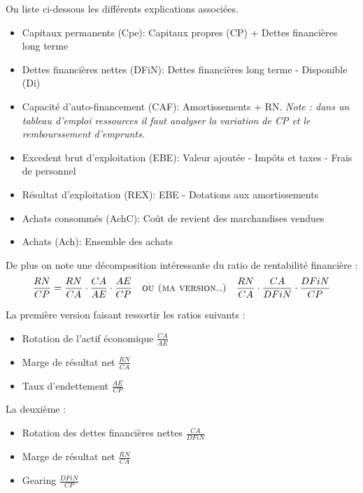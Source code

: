 \documentclass[12pt,oneside,a4paper]{article}
\begin{document}
On liste ci-dessous les différents explications associées.

\begin{itemize}[label=]

	\item Capitaux permanents (Cpe): Capitaux propres (CP) + Dettes financières long terme 
	\item Dettes financières nettes (DFiN): Dettes financières long terme - Disponible (Di)

	\item Capacité d'auto-financement (CAF): Amortissements + RN. \emph{Note : dans un tableau d'emploi ressources il faut analyser la variation de CP et le rembourssement d'emprunts.}

	\item Excedent brut d'exploitation (EBE): Valeur ajoutée - Impôts et taxes - Frais de personnel

	\item Résultat d'exploitation (REX): EBE - Dotations aux amortissements

	\item Achats consommés (AchC): Coût de revient des marchandises vendues

	\item Achats (Ach): Ensemble des achats

\end{itemize}

De plus on note une décomposition intéressante du ratio de rentabilité financière : 
\[
	\frac{RN}{CP}= \frac{RN}{CA}\cdot\frac{CA}{AE}\cdot\frac{AE}{CP} \quad \textsc{ou (ma version..)} \quad \frac{RN}{CA}\cdot\frac{CA}{DFiN}\cdot\frac{DFiN}{CP}
\]

La première version faisant ressortir les ratios suivants : 
\begin{itemize}[label=]

	\item Rotation de l'actif économique $\frac{CA}{AE}$

	\item Marge de résultat net $\frac{RN}{CA}$

	\item Taux d'endettement $\frac{AE}{CP}$

\end{itemize}

La deuxième : 

\begin{itemize}[label=]

	\item Rotation des dettes financières nettes $\frac{CA}{DFiN}$

	\item Marge de résultat net $\frac{RN}{CA}$

	\item Gearing $\frac{DFiN}{CP}$

\end{itemize}
\end{document}
